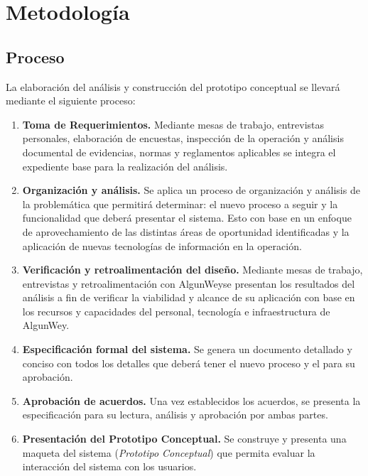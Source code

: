 \documentclass[10pt]{book}
\newcommand{\cliente}{AlgunWey}
\begin{document}
	
\chapter{Metodología}


\section{Proceso}

	La elaboración del análisis y construcción del prototipo conceptual se llevará mediante el siguiente proceso:
	
	
\begin{enumerate}
	\item {\bf Toma de Requerimientos.} Mediante mesas de trabajo, entrevistas personales, elaboración de encuestas, inspección de la operación y análisis documental de evidencias, normas y reglamentos aplicables se integra el expediente base para la realización del análisis.
	\item {\bf Organización y análisis.} Se aplica un proceso de organización y análisis de la problemática que permitirá determinar: el nuevo proceso a seguir y la funcionalidad que deberá presentar el sistema. Esto con base en un enfoque de aprovechamiento de las distintas áreas de oportunidad identificadas y la aplicación de nuevas tecnologías de información en la operación.
	\item {\bf Verificación y retroalimentación del diseño.} Mediante mesas de trabajo, entrevistas y retroalimentación con \cliente se presentan los resultados del análisis a fin de verificar la viabilidad y alcance de su aplicación con base en los recursos y capacidades del personal, tecnología e infraestructura de \cliente.
	\item {\bf Especificación formal del sistema.} Se genera un documento detallado y conciso con todos los detalles que deberá tener el nuevo proceso y el \proyecto para su aprobación.  
	\item {\bf Aprobación de acuerdos.} Una vez establecidos los acuerdos, se presenta la especificación para su lectura, análisis y aprobación por ambas partes.
	\item {\bf Presentación del Prototipo Conceptual.} Se construye y presenta una maqueta del sistema ({\em Prototipo Conceptual}) que permita evaluar la interacción del sistema con los usuarios.
\end{enumerate}
\end{document}
